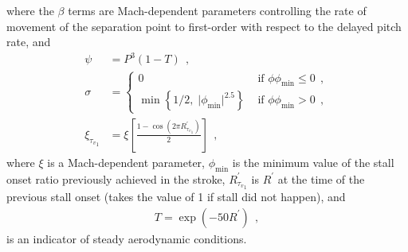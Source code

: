 \documentclass[12pt,a4paper,oneside,english]{abntex2} %
\newcommand{\abs}[1]{\lvert#1\rvert}
\def\lb{\left[}
\def\rb{\right]}
\def\lp{\left(}
\def\rp{\right)}
\def\minim{_\text{min}}
\begin{document}
where the $\beta$ terms are Mach-dependent parameters controlling the rate of movement of the separation point to first-order with respect to the delayed pitch rate, and
\begin{align}
    \psi &= P^3\lp1-T\rp \ \ ,
    \label{eq:psi}
    \\
    \sigma &=
    \begin{cases}
        0 &\text{ if } \phi\phi\minim \leq 0 \ \ ,
        \\
        \min \left\{ 1/2 ,\;  \abs{\phi\minim}^{2.5} \right\} &\text{ if } \phi\phi\minim > 0 \ \ ,
    \end{cases}    
    \label{eq:sigma} 
    \\
    \xi_{{\tau_v}_1} &= \xi\lb\frac{1-\cos{\lp2\pi R^{\prime}_{{\tau_v}_1}\rp}}{2}\rb \ \ ,
    \label{eq:xi_tv} 
\end{align}  
where $\xi$ is a Mach-dependent parameter, $\phi\minim$ is the minimum value of the stall onset ratio previously achieved in the stroke, $R^{\prime}_{{\tau_v}_1}$ is $R^{\prime}$ at the time of the previous stall onset (takes the value of 1 if stall did not happen), and
\begin{align}
    T = \exp\lp-50R^\prime\rp \ \ ,
    \label{eq:T}
\end{align}
is an indicator of steady aerodynamic conditions. 
\end{document}
